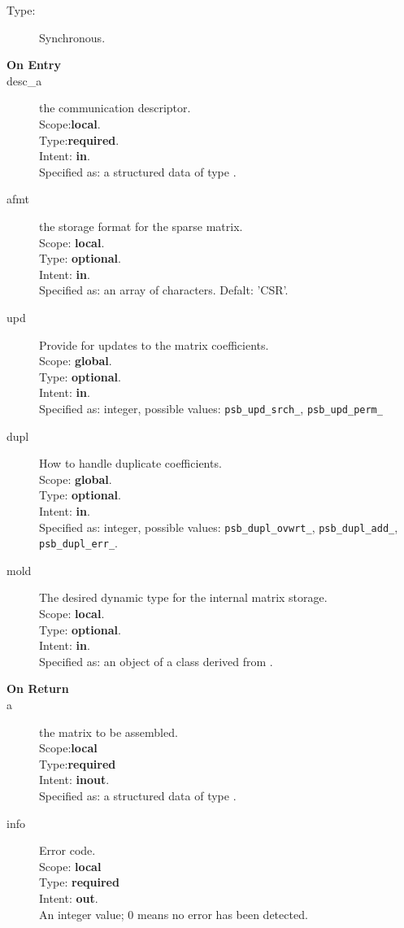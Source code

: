 \begin{description}
\item[Type:] Synchronous.
\item[\bf On Entry]
\item[desc\_a] the communication descriptor.\\
Scope:{\bf local}.\\
Type:{\bf required}.\\
Intent: {\bf in}.\\
Specified as: a structured data of type \descdata.
\item[afmt] the storage format for the sparse matrix.\\
Scope: {\bf local}.\\
Type: {\bf optional}.\\
Intent: {\bf in}.\\
Specified as: an array of characters. Defalt:  'CSR'.
\item[upd] Provide for updates to the matrix coefficients.\\
Scope: {\bf global}.\\
Type: {\bf optional}.\\
Intent: {\bf in}.\\
Specified as: integer, possible values: \verb|psb_upd_srch_|, \verb|psb_upd_perm_|
\item[dupl] How to handle duplicate coefficients.\\
Scope: {\bf global}.\\
Type: {\bf optional}.\\
Intent: {\bf in}.\\
Specified as: integer, possible values: \verb|psb_dupl_ovwrt_|,
\verb|psb_dupl_add_|, \verb|psb_dupl_err_|.
\item[mold] The desired dynamic type for the internal matrix storage.\\
Scope: {\bf local}.\\
Type: {\bf optional}.\\
Intent: {\bf in}.\\
Specified as: an object of a class derived from \spbasedata. 
\end{description}

\begin{description}
\item[\bf On Return]
\item[a] the matrix to be assembled.\\
Scope:{\bf local}\\
Type:{\bf required}\\
Intent: {\bf inout}.\\
Specified as: a structured data of type \spdata.
\item[info] Error code.\\
Scope: {\bf local} \\
Type: {\bf required} \\
Intent: {\bf out}.\\
An integer value; 0 means no error has been detected. 
\end{description}

